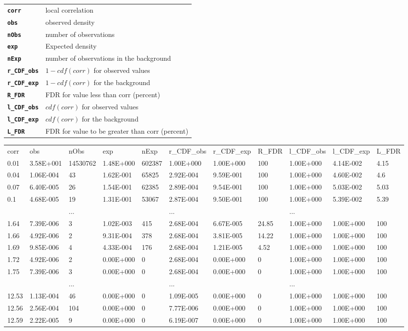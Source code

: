 \documentclass{article}
\newcommand{\prm}[1]{\texttt{\textbf{{#1}}}}
\begin{document}
\begin{tabular}{ll}
\prm{corr} & local correlation\\
\prm{obs} 			& observed density \\
\prm{nObs} & number of observations\\
\prm{exp } & Expected density\\
\prm{nExp} & number of observations in the background\\
\prm{r\_CDF\_obs} & $1-cdf(corr)$ for observed values\\
\prm{r\_CDF\_exp} & $1-cdf(corr)$ for the background\\
\prm{R\_FDR} & FDR for value less than corr (percent)\\
\prm{l\_CDF\_obs} & $cdf(corr)$ for observed values\\
\prm{l\_CDF\_exp} & $cdf(corr)$ for the background\\
\prm{L\_FDR} & FDR for value to be greater than corr (percent)\\
\end{tabular}
\begin{shaded} 
\begin{scriptsize}
\begin{tabular}{lllllllllll}
corr&obs&nObs&exp&nExp&r\_CDF\_obs&r\_CDF\_exp&R\_FDR&l\_CDF\_obs&l\_CDF\_exp&L\_FDR\\
0.01&3.58E+001&14530762&1.48E+000&602387&1.00E+000&1.00E+000&100&1.00E+000&4.14E-002&4.15\\
0.04&1.06E-004&43&1.62E-001&65825&2.92E-004&9.59E-001&100&1.00E+000&4.60E-002&4.6\\
0.07&6.40E-005&26&1.54E-001&62385&2.89E-004&9.54E-001&100&1.00E+000&5.03E-002&5.03\\
0.1&4.68E-005&19&1.31E-001&53067&2.87E-004&9.50E-001&100&1.00E+000&5.39E-002&5.39\\
&&...&&&...&&&...&&\\
1.64&7.39E-006&3&1.02E-003&415&2.68E-004&6.67E-005&24.85&1.00E+000&1.00E+000&100\\
1.66&4.92E-006&2&9.31E-004&378&2.68E-004&3.81E-005&14.22&1.00E+000&1.00E+000&100\\
1.69&9.85E-006&4&4.33E-004&176&2.68E-004&1.21E-005&4.52&1.00E+000&1.00E+000&100\\
1.72&4.92E-006&2&0.00E+000&0&2.68E-004&0.00E+000&0&1.00E+000&1.00E+000&100\\
1.75&7.39E-006&3&0.00E+000&0&2.68E-004&0.00E+000&0&1.00E+000&1.00E+000&100\\
&&...&&&...&&&...&&\\
12.53&1.13E-004&46&0.00E+000&0&1.09E-005&0.00E+000&0&1.00E+000&1.00E+000&100\\
12.56&2.56E-004&104&0.00E+000&0&7.77E-006&0.00E+000&0&1.00E+000&1.00E+000&100\\
12.59&2.22E-005&9&0.00E+000&0&6.19E-007&0.00E+000&0&1.00E+000&1.00E+000&100\\
\end{tabular}
\end{scriptsize}
\end{shaded}
\end{document}
